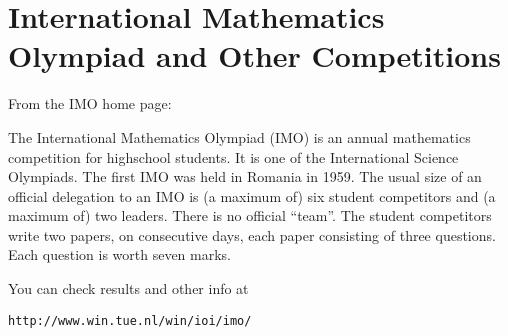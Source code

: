 
\section{International Mathematics Olympiad and Other Competitions}

From the IMO home page:

The International Mathematics Olympiad (IMO) is an annual mathematics 
competition for highschool students. It is one of the International 
Science Olympiads. The first IMO was held in Romania in 1959. The
usual size of an official delegation to an IMO is (a maximum of) 
six student competitors and (a maximum of) two leaders. There is no 
official ``team''. The student competitors write two papers, on 
consecutive days, each paper consisting of three questions. Each question 
is worth seven marks. 

You can check results and other info at

\begin{verbatim}
http://www.win.tue.nl/win/ioi/imo/
\end{verbatim}






